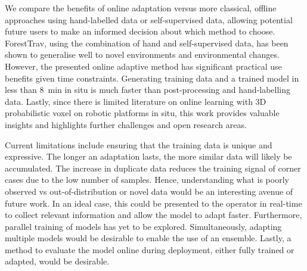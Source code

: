 We compare the benefits of online adaptation versus more classical, offline approaches using hand-labelled data or self-supervised data, allowing potential future users to make an informed decision about which method to choose.  ForestTrav, using the combination of hand and self-supervised data, has been shown to generalise well to novel environments and environmental changes.  However, the presented online adaptive method has significant practical use benefits given time constraints. Generating training data and a trained model in less than \qty{8}{\minute} in situ is much faster than post-processing and hand-labelling data. Lastly, since there is limited literature on online learning with 3D probabilistic voxel on robotic platforms in situ, this work provides valuable insights and highlights further challenges and open research areas.

 Current limitations include ensuring that the training data is unique and expressive. The longer an adaptation lasts, the more similar data will likely be accumulated. The increase in duplicate data reduces the training signal of corner cases due to the low number of samples. Hence, understanding what is poorly observed vs out-of-distribution or novel data would be an interesting avenue of future work. In an ideal case, this could be presented to the operator in real-time to collect relevant information and allow the model to adapt faster. Furthermore, parallel training of models has yet to be explored. Simultaneously, adapting multiple models would be desirable to enable the use of an ensemble. Lastly, a method to evaluate the model online during deployment, either fully trained or adapted, would be desirable.